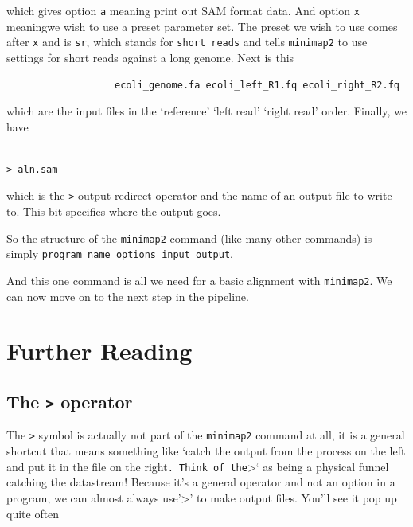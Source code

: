 \documentclass[]{book}
\begin{document}
which gives option \texttt{a} meaning print out SAM format data. And option \texttt{x} meaningwe wish to use a preset parameter set. The preset we wish to use comes after \texttt{x} and is \texttt{sr}, which stands for \texttt{short\ reads} and tells \texttt{minimap2} to use settings for short reads against a long genome. Next is this

\begin{verbatim}
                   ecoli_genome.fa ecoli_left_R1.fq ecoli_right_R2.fq
\end{verbatim}

which are the input files in the `reference' `left read' `right read' order. Finally, we have

\begin{verbatim}
                                                                       > aln.sam
\end{verbatim}

which is the \texttt{\textgreater{}} output redirect operator and the name of an output file to write to. This bit specifies where the output goes.

So the structure of the \texttt{minimap2} command (like many other commands) is simply \texttt{program\_name\ options\ input\ output}.

And this one command is all we need for a basic alignment with \texttt{minimap2}. We can now move on to the next step in the pipeline.

\hypertarget{further-reading-1}{%
\section{Further Reading}\label{further-reading-1}}

\hypertarget{the-operator}{%
\subsection{\texorpdfstring{The \texttt{\textgreater{}} operator}{The \textgreater{} operator}}\label{the-operator}}

The \texttt{\textgreater{}} symbol is actually not part of the \texttt{minimap2} command at all, it is a general shortcut that means something like `catch the output from the process on the left and put it in the file on the right\texttt{.\ Think\ of\ the}\textgreater{}` as being a physical funnel catching the datastream! Because it's a general operator and not an option in a program, we can almost always use'\textgreater{}' to make output files. You'll see it pop up quite often
\end{document}
